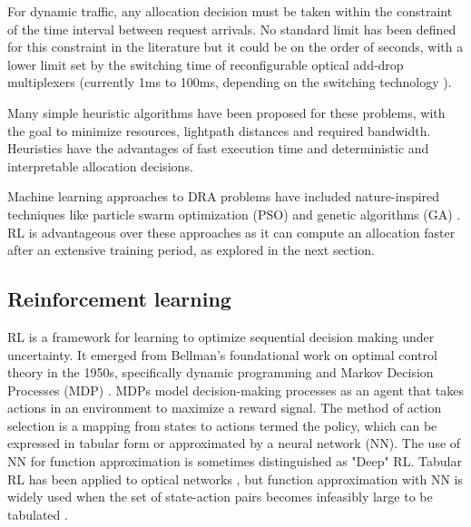 For dynamic traffic, any allocation decision must be taken within the constraint of the time interval between request arrivals. No standard limit has been defined for this constraint in the literature but it could be on the order of seconds, with a lower limit set by the switching time of reconfigurable optical add-drop multiplexers (currently 1ms to 100ms, depending on the switching technology \cite{goto_lcos-based_2024}).

Many simple heuristic algorithms \cite{vincent_scalable_2019,abkenar_best_2016,wright_minimum-_2015,tang_heuristic_2022,savory_congestion_2014} have been proposed for these problems, with the goal to minimize resources, lightpath distances and required bandwidth. Heuristics have the advantages of fast execution time and deterministic and interpretable allocation decisions.

Machine learning approaches to DRA problems have included nature-inspired techniques like particle swarm optimization (PSO) \cite{hassan_chaotic_2009} and genetic algorithms (GA) \cite{barpanda_genetic_2011}. RL is advantageous over these approaches as it can compute an allocation faster \cite{di_cicco_deep_2022} after an extensive training period, as explored in the next section.

\subsection{Reinforcement learning}
\label{sec:background_rl}

RL is a framework for learning to optimize sequential decision making under uncertainty. It emerged from Bellman's foundational work on optimal control theory in the 1950s, specifically dynamic programming and Markov Decision Processes (MDP) \cite{bellman_theory_1954,bellman_markovian_1957}. MDPs model decision-making processes as an agent that takes actions in an environment to maximize a reward signal. The method of action selection is a mapping from states to actions termed the policy, which can be expressed in tabular form or approximated by a neural network (NN). The use of NN for function approximation is sometimes distinguished as "Deep" RL. Tabular RL has been applied to optical networks \cite{terki_routing_2023}, but function approximation with NN is widely used \cite{chen_deeprmsa_2019,shimoda_mask_2021,tang_heuristic_2022,xu_deep_2022,cheng_ptrnet-rsa_2024} when the set of state-action pairs becomes infeasibly large to be tabulated \cite{sutton_reinforcement_2018}.

